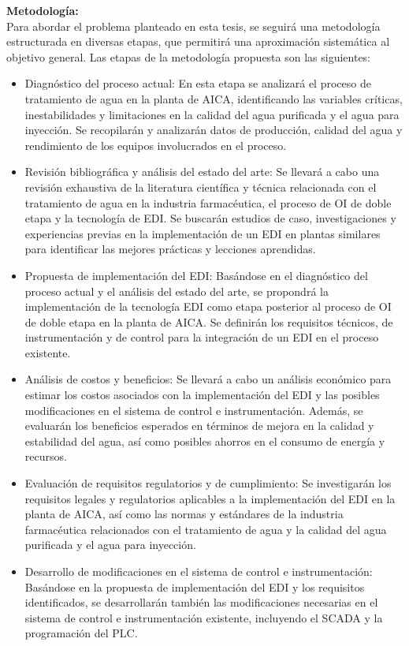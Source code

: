 \textbf{Metodología:}\\
Para abordar el problema planteado en esta tesis, se seguirá una metodología estructurada en diversas etapas, que permitirá una aproximación sistemática al objetivo general. Las etapas de la metodología propuesta son las siguientes:
\begin{itemize}
	\item Diagnóstico del proceso actual: En esta etapa se analizará el proceso de tratamiento de agua en la planta de AICA, identificando las variables críticas, inestabilidades y limitaciones en la calidad del agua purificada y el agua para inyección. Se recopilarán y analizarán datos de producción, calidad del agua y rendimiento de los equipos involucrados en el proceso.
	\item Revisión bibliográfica y análisis del estado del arte: Se llevará a cabo una revisión exhaustiva de la literatura científica y técnica relacionada con el tratamiento de agua en la industria farmacéutica, el proceso de OI de doble etapa y la tecnología de EDI. Se buscarán estudios de caso, investigaciones y experiencias previas en la implementación de un EDI en plantas similares para identificar las mejores prácticas y lecciones aprendidas.
	\item Propuesta de implementación del EDI: Basándose en el diagnóstico del proceso actual y el análisis del estado del arte, se propondrá la implementación de la tecnología EDI como etapa posterior al proceso de OI de doble etapa en la planta de AICA. Se definirán los requisitos técnicos, de instrumentación y de control para la integración de un EDI en el proceso existente.
	\item Análisis de costos y beneficios: Se llevará a cabo un análisis económico para estimar los costos asociados con la implementación del EDI y las posibles modificaciones en el sistema de control e instrumentación. Además, se evaluarán los beneficios esperados en términos de mejora en la calidad y estabilidad del agua, así como posibles ahorros en el consumo de energía y recursos.
	\item Evaluación de requisitos regulatorios y de cumplimiento: Se investigarán los requisitos legales y regulatorios aplicables a la implementación del EDI en la planta de AICA, así como las normas y estándares de la industria farmacéutica relacionados con el tratamiento de agua y la calidad del agua purificada y el agua para inyección.

	\item Desarrollo de modificaciones en el sistema de control e instrumentación: Basándose en la propuesta de
	      implementación del EDI y los requisitos identificados, se desarrollarán también las modificaciones necesarias en el
	      sistema de control e instrumentación existente, incluyendo el SCADA y la programación del PLC.
\end{itemize}






